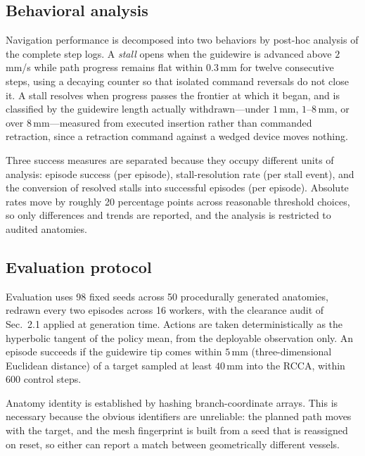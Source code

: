 \subsection{Behavioral analysis}
\label{sec:behavior}


Navigation performance is decomposed into two behaviors by post-hoc analysis of the complete
step logs. A \emph{stall} opens when the guidewire is advanced above $2$\,mm/s while path
progress remains flat within $0.3$\,mm for twelve consecutive steps, using a decaying counter so
that isolated command reversals do not close it. A stall resolves when progress passes the
frontier at which it began, and is classified by the guidewire length actually withdrawn---under
$1$\,mm, $1$--$8$\,mm, or over $8$\,mm---measured from executed insertion rather than commanded
retraction, since a retraction command against a wedged device moves nothing.

Three success measures are separated because they occupy different units of analysis: episode
success (per episode), stall-resolution rate (per stall event), and the conversion of resolved
stalls into successful episodes (per episode). Absolute rates move by roughly 20 percentage
points across reasonable threshold choices, so only differences and trends are reported, and the
analysis is restricted to audited anatomies.

\subsection{Evaluation protocol}
\label{sec:eval}

Evaluation uses 98 fixed seeds across 50 procedurally generated anatomies, redrawn every two
episodes across 16 workers, with the clearance audit of Sec.~2.1 applied at generation time.
Actions are taken deterministically as the hyperbolic tangent of the policy mean, from the
deployable observation only. An episode succeeds if the guidewire tip comes within $5$\,mm
(three-dimensional Euclidean distance) of a target sampled at least $40$\,mm into the RCCA,
within 600 control steps.

Anatomy identity is established by hashing branch-coordinate arrays. This is necessary because
the obvious identifiers are unreliable: the planned path moves with the target, and the mesh
fingerprint is built from a seed that is reassigned on reset, so either can report a match
between geometrically different vessels.

